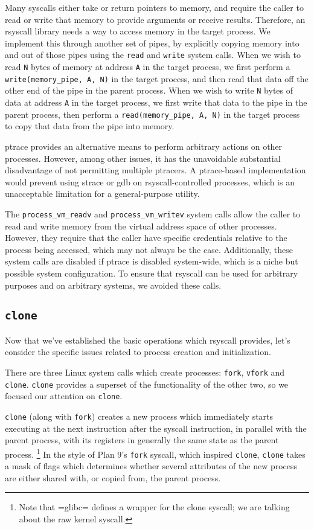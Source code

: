 \documentclass[sigplan]{acmart}
\begin{document}
Many syscalls either take or return pointers to memory,
and require the caller to read or write that memory to provide arguments or receive results.
Therefore, an rsyscall library needs a way to access memory in the target process.
We implement this through another set of pipes,
by explicitly copying memory into and out of those pipes using the \texttt{read} and \texttt{write} system calls.
When we wish to read \texttt{N} bytes of memory at address \texttt{A} in the target process,
we first perform a \verb|write(memory_pipe, A, N)| in the target process,
and then read that data off the other end of the pipe in the parent process.
When we wish to write \texttt{N} bytes of data at address \texttt{A} in the target process,
we first write that data to the pipe in the parent process,
then perform a \verb|read(memory_pipe, A, N)| in the target process to copy that data from the pipe into memory.

ptrace provides an alternative means to perform arbitrary actions on other processes.
However, among other issues, it has the unavoidable substantial disadvantage of not permitting multiple ptracers.
A ptrace-based implementation would prevent using strace or gdb on rsyscall-controlled processes,
which is an unacceptable limitation for a general-purpose utility.

The \verb|process_vm_readv| and \verb|process_vm_writev| system calls
allow the caller to read and write memory from the virtual address space of other processes.
However, they require that the caller have specific credentials relative to the process being accessed,
which may not always be the case.
Additionally, these system calls are disabled if ptrace is disabled system-wide,
which is a niche but possible system configuration.
To ensure that rsyscall can be used for arbitrary purposes and on arbitrary systems, we avoided these calls.
\subsection{\texttt{clone}}\label{clone}
Now that we've established the basic operations which rsyscall provides,
let's consider the specific issues related to process creation and initialization.

There are three Linux system calls which create processes:
\texttt{fork}, \texttt{vfork} and \texttt{clone}.
\texttt{clone} provides a superset of the functionality of the other two,
so we focused our attention on \texttt{clone}.

\texttt{clone} (along with \texttt{fork}) creates a new process
which immediately starts executing at the next instruction after the syscall instruction,
in parallel with the parent process,
with its registers in generally the same state as the parent process.
\footnote{Note that =glibc= defines a wrapper for the clone syscall;
we are talking about the raw kernel syscall.}
In the style of Plan 9's \texttt{fork} syscall\cite{rfork}, which inspired \texttt{clone},
\texttt{clone} takes a mask of flags which determines whether several attributes of the new process
are either shared with, or copied from, the parent process.
\end{document}
